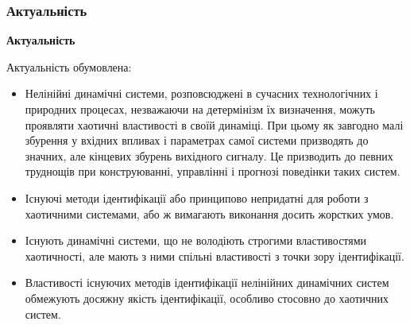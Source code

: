 \documentclass[14pt,handout,utf8]{beamer}
\newcommand{\Xhead}[1]{
 \begin{center}%
      \textbf{#1}%
 \end{center}%
}
\begin{document}
\begin{frame}
  \frametitle{Актуальність}

  \Xhead{Актуальність}

   Актуальність обумовлена:

  \begin{itemize}

    \item
      Нелінійні динамічні системи, розповсюджені в сучасних технологічних і
      природних процесах, незважаючи на детермінізм їх визначення, можуть проявляти
      хаотичні властивості в своїй динаміці. При цьому як завгодно малі збурення у вхідних
      впливах і параметрах самої системи призводять до значних, але кінцевих збурень
      вихідного сигналу. Це призводить до певних труднощів при конструюванні,
      управлінні і прогнозі поведінки таких систем.

    \item
      Існуючі методи ідентифікації або принципово непридатні для
      роботи з хаотичними системами, або ж вимагають виконання досить
      жорстких умов.

    \item
      Існують динамічні системи, що не володіють строгими
      властивостями хаотичності, але мають з ними спільні властивості
      з точки зору ідентифікації.

    \item
      Властивості існуючих методів ідентифікації нелінійних
      динамічних систем обмежують досяжну якість ідентифікації,
      особливо стосовно до хаотичних систем.

  \end{itemize}


\end{frame}




\end{document}
